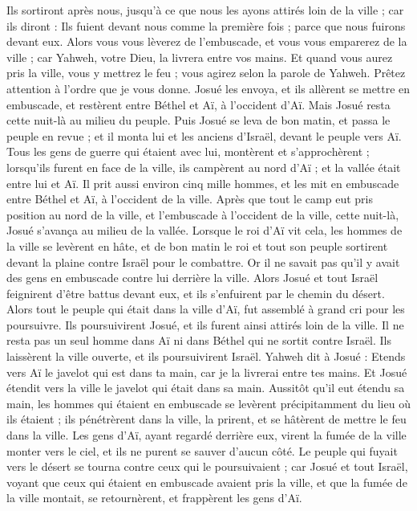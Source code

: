 \begin{multicols}{2}
Ils sortiront après nous, jusqu’à ce que nous les ayons attirés loin de la ville ; car ils diront : Ils fuient devant nous comme la première fois ; parce que nous fuirons devant eux.
Alors vous vous lèverez de l’embuscade, et vous vous emparerez de la ville ; car Yahweh, votre Dieu, la livrera entre vos mains.
Et quand vous aurez pris la ville, vous y mettrez le feu ; vous agirez selon la parole de Yahweh. Prêtez attention à l’ordre que je vous donne.
Josué les envoya, et ils allèrent se mettre en embuscade, et restèrent entre Béthel et Aï, à l’occident d’Aï. Mais Josué resta cette nuit-là au milieu du peuple.
Puis Josué se leva de bon matin, et passa le peuple en revue ; et il monta lui et les anciens d’Israël, devant le peuple vers Aï.
Tous les gens de guerre qui étaient avec lui, montèrent et s’approchèrent ; lorsqu’ils furent en face de la ville, ils campèrent au nord d’Aï ; et la vallée était entre lui et Aï.
Il prit aussi environ cinq mille hommes, et les mit en embuscade entre Béthel et Aï, à l’occident de la ville.
Après que tout le camp eut pris position au nord de la ville, et l’embuscade à l’occident de la ville, cette nuit-là, Josué s’avança au milieu de la vallée.
Lorsque le roi d’Aï vit cela, les hommes de la ville se levèrent en hâte, et de bon matin le roi et tout son peuple sortirent devant la plaine contre Israël pour le combattre. Or il ne savait pas qu’il y avait des gens en embuscade contre lui derrière la ville.
Alors Josué et tout Israël feignirent d’être battus devant eux, et ils s’enfuirent par le chemin du désert.
Alors tout le peuple qui était dans la ville d’Aï, fut assemblé à grand cri pour les poursuivre. Ils poursuivirent Josué, et ils furent ainsi attirés loin de la ville.
Il ne resta pas un seul homme dans Aï ni dans Béthel qui ne sortit contre Israël. Ils laissèrent la ville ouverte, et ils poursuivirent Israël.
Yahweh dit à Josué : Etends vers Aï le javelot qui est dans ta main, car je la livrerai entre tes mains. Et Josué étendit vers la ville le javelot qui était dans sa main.
Aussitôt qu’il eut étendu sa main, les hommes qui étaient en embuscade se levèrent précipitamment du lieu où ils étaient ; ils pénétrèrent dans la ville, la prirent, et se hâtèrent de mettre le feu dans la ville.
Les gens d’Aï, ayant regardé derrière eux, virent la fumée de la ville monter vers le ciel, et ils ne purent se sauver d’aucun côté. Le peuple qui fuyait vers le désert se tourna contre ceux qui le poursuivaient ;
car Josué et tout Israël, voyant que ceux qui étaient en embuscade avaient pris la ville, et que la fumée de la ville montait, se retournèrent, et frappèrent les gens d’Aï.

\end{multicols}
